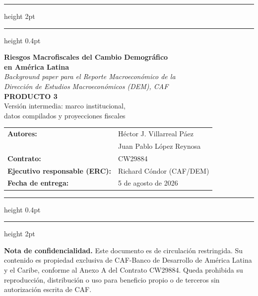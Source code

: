 \documentclass[12pt, letterpaper]{article}
\begin{document}
\thispagestyle{empty}

\vspace*{1cm}

{\color{cafblue}\hrule height 2pt}
\vspace{0.4cm}
{\color{cafblue}\hrule height 0.4pt}
\vspace{0.8cm}

\begin{center}
  {\Large\bfseries\color{cafblue}
    Riesgos Macrofiscales del Cambio Demográfico\\[6pt]
    en América Latina}\\[1cm]

  {\large\itshape
    \textit{Background paper} para el Reporte Macroeconómico de la\\
    Dirección de Estudios Macroeconómicos (DEM), CAF}\\[1.5cm]

  {\normalsize\bfseries PRODUCTO 3}\\[0.3cm]
  {\normalsize Versión intermedia: marco institucional,\\
   datos compilados y proyecciones fiscales}\\[1.5cm]

  \begin{tabular}{ll}
    \textbf{Autores:}            & Héctor J. Villarreal Páez \\[4pt]
                                 & Juan Pablo López Reynosa \\[4pt]
    \textbf{Contrato:}           & CW29884 \\[4pt]
    \textbf{Ejecutivo responsable (ERC):} & Richard Cóndor (CAF/DEM) \\[4pt]
    \textbf{Fecha de entrega:}   & 5 de agosto de 2026 \\
  \end{tabular}
\end{center}

\vspace{1.5cm}
{\color{cafblue}\hrule height 0.4pt}
\vspace{0.4cm}
{\color{cafblue}\hrule height 2pt}

\vspace{2cm}

\begin{small}
\noindent\textbf{Nota de confidencialidad.}
Este documento es de circulación restringida. Su contenido es propiedad exclusiva
de CAF-Banco de Desarrollo de América Latina y el Caribe, conforme al Anexo A del
Contrato CW29884. Queda prohibida su reproducción, distribución o uso para
beneficio propio o de terceros sin autorización escrita de CAF.
\end{small}
\end{document}
